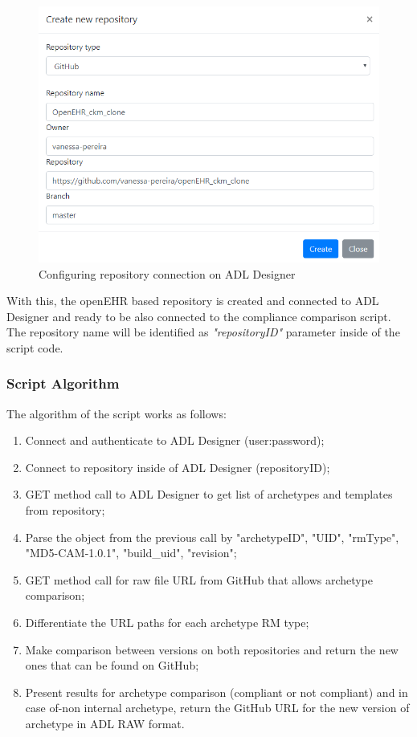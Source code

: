 \documentclass[mim_thesis.tex]{subfiles}
\begin{document}
\begin{figure}[H]
	\centering
    \includegraphics[width=1\textwidth]{img/adl_designer_repositories.PNG}
	\caption{Configuring repository connection on ADL Designer}
	\label{fig:adl_designer_repositories}
\end{figure}

With this, the openEHR based repository is created and connected to ADL Designer and ready to be also connected to the compliance comparison script. The repository name will be identified as \textit{"repositoryID"} parameter inside of the script code.

\subsubsection{Script Algorithm}
The algorithm of the script works as follows:
\begin{enumerate}[noitemsep]
\item Connect and authenticate to ADL Designer (user:password);
\item Connect to repository inside of ADL Designer (repositoryID);
\item GET method call to ADL Designer to get list of archetypes and templates from repository;
\item Parse the object from the previous call by "archetypeID", "UID", "rmType", "MD5-CAM-1.0.1", "build\_uid", "revision";
\item GET method call for raw file URL from GitHub that allows archetype comparison;
\item Differentiate the URL paths for each archetype RM type;
\item Make comparison between versions on both repositories and return the new ones that can be found on GitHub;
\item Present results for archetype comparison (compliant or not compliant) and in case of-non internal archetype, return the GitHub URL for the new version of archetype in ADL RAW format.
\end{enumerate}
 
\end{document}
